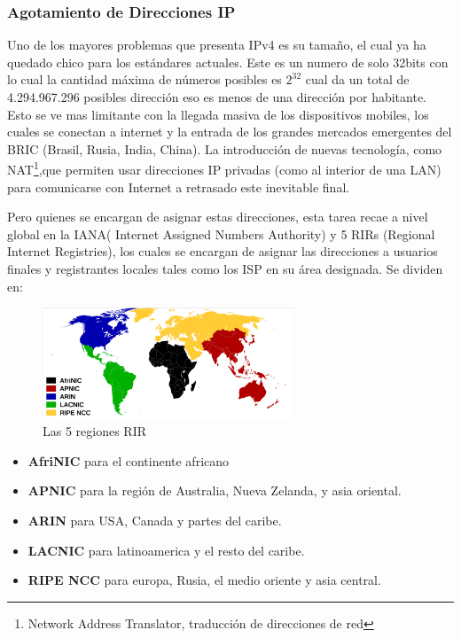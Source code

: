 \documentclass[11pt,a4paper]{article}
\begin{document}
\subsubsection{Agotamiento de Direcciones IP}
Uno de los mayores problemas que presenta IPv4 es su tamaño, el cual ya ha quedado chico para los
estándares actuales. Este es un numero de solo 32bits con lo cual la cantidad máxima de números
posibles es $2^{32}$ cual da un total de 4.294.967.296 posibles dirección eso es menos de una
dirección por habitante. Esto se ve mas limitante con la llegada masiva de los dispositivos mobiles, 
los cuales se conectan a internet y la entrada de los grandes mercados emergentes del BRIC (Brasil, 
Rusia, India, China).
La introducción de nuevas tecnología, como NAT\footnote{Network Address Translator, traducción de 
direcciones de red},que permiten usar direcciones IP privadas (como al interior de una LAN) para 
comunicarse con Internet a retrasado este inevitable final.\par
Pero quienes se encargan de asignar estas direcciones, esta tarea recae a nivel global en la IANA( 
Internet Assigned Numbers Authority) y 5 RIRs (Regional Internet Registries), los cuales se encargan 
de asignar las direcciones a usuarios finales y registrantes locales tales como los ISP en su área 
designada. Se dividen en:
\begin{figure}[h]
\centering
  \includegraphics[width=0.67\textwidth]{RIR.png}
 \caption[Las 5 regiones RIR]{Las 5 regiones RIR}
\end{figure}
\begin{itemize}
\item \textbf{AfriNIC} para el continente africano
\item \textbf{APNIC} para la región de Australia, Nueva Zelanda, y asia oriental.
\item \textbf{ARIN} para USA, Canada y partes del caribe.
\item \textbf{LACNIC} para latinoamerica y el resto del caribe.
\item \textbf{RIPE NCC} para europa, Rusia, el medio oriente y asia central.
\end{itemize}\vspace{.2cm}
\end{document}
